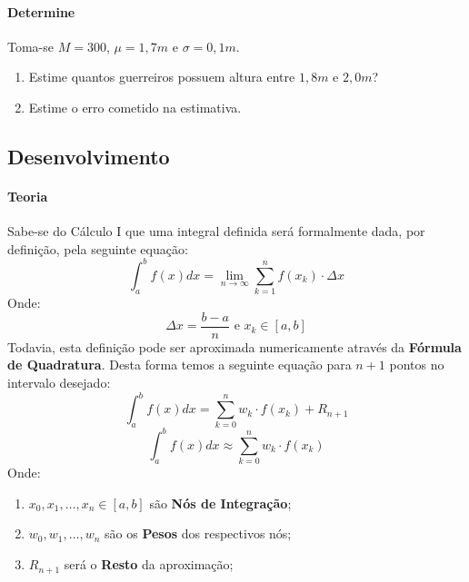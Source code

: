 \documentclass{article}
\begin{document}
            \paragraph{Determine}Toma-se $M = 300$, $\mu = 1,7m$ e $\sigma = 0,1m$.
                \begin{enumerate}[noitemsep]
                    \item Estime quantos guerreiros possuem altura entre $1,8m$ e $2,0m$?
                    \item Estime o erro cometido na estimativa.
                \end{enumerate}

        \subsection{Desenvolvimento}
            \paragraph{Teoria}Sabe-se do Cálculo I que uma integral definida será formalmente dada, por definição, pela seguinte equação:
                \begin{equation}
                    \boxed{\int_{a}^{b} f(x) dx = \lim_{n\to\infty} \sum_{k=1}^{n} f(x_{k})\cdot\Delta x}
                \end{equation}
            Onde:
                \[\Delta x = \frac{b - a}{n} \text{ e } x_{k} \in [a, b]\]
            Todavia, esta definição pode ser aproximada numericamente através da \textbf{Fórmula de Quadratura}. Desta forma temos a seguinte equação para $n+1$ pontos no intervalo desejado:
                \begin{equation}
                    \boxed{\int_{a}^{b} f(x) dx = \sum_{k=0}^{n} w_{k} \cdot f(x_{k}) + R_{n+1}}
                \end{equation}
                \[\int_{a}^{b} f(x) dx\approx \sum_{k=0}^{n} w_{k} \cdot f(x_{k})\]
            Onde:
                \begin{enumerate}[noitemsep]
                    \item $x_{0}, x_{1}, \dots, x_{n} \in [a, b]$ são \textbf{Nós de Integração};
                    \item $w_{0}, w_{1}, \dots, w_{n}$ são os \textbf{Pesos} dos respectivos nós;
                    \item $R_{n+1}$ será o \textbf{Resto} da aproximação;
                \end{enumerate}
\end{document}
